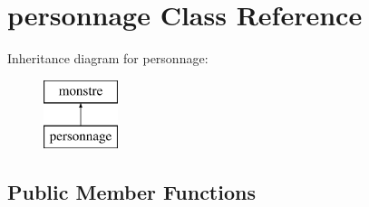 \hypertarget{classpersonnage}{}\section{personnage Class Reference}
\label{classpersonnage}
Inheritance diagram for personnage\+:\begin{figure}[H]
\begin{center}
\leavevmode
\includegraphics[height=2.000000cm]{classpersonnage}
\end{center}
\end{figure}
\subsection*{Public Member Functions}
